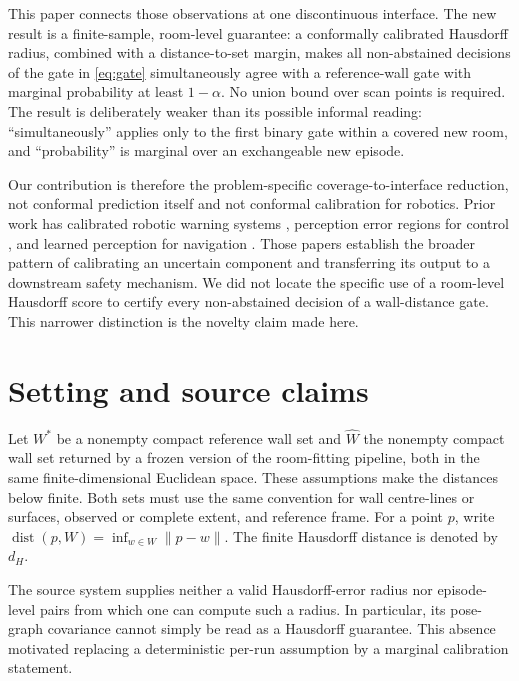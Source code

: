 \documentclass{article}
\DeclareMathOperator{\dist}{dist}
\begin{document}
This paper connects those observations at one discontinuous interface. The new result is a finite-sample, room-level guarantee: a conformally calibrated Hausdorff radius, combined with a distance-to-set margin, makes all non-abstained decisions of the gate in \eqref{eq:gate} simultaneously agree with a reference-wall gate with marginal probability at least $1-\alpha$. No union bound over scan points is required. The result is deliberately weaker than its possible informal reading: ``simultaneously'' applies only to the first binary gate within a covered new room, and ``probability'' is marginal over an exchangeable new episode.

Our contribution is therefore the problem-specific coverage-to-interface reduction, not conformal prediction itself and not conformal calibration for robotics. Prior work has calibrated robotic warning systems \cite{luo2021sample}, perception error regions for control \cite{yang2023safe}, and learned perception for navigation \cite{mei2024perceive}. Those papers establish the broader pattern of calibrating an uncertain component and transferring its output to a downstream safety mechanism. We did not locate the specific use of a room-level Hausdorff score to certify every non-abstained decision of a wall-distance gate. This narrower distinction is the novelty claim made here.

\section{Setting and source claims}

Let $W^*$ be a nonempty compact reference wall set and $\widehat W$ the nonempty compact wall set returned by a frozen version of the room-fitting pipeline, both in the same finite-dimensional Euclidean space. These assumptions make the distances below finite. Both sets must use the same convention for wall centre-lines or surfaces, observed or complete extent, and reference frame. For a point $p$, write $\dist(p,W)=\inf_{w\in W}\lVert p-w\rVert$. The finite Hausdorff distance is denoted by $d_H$.

The source system supplies neither a valid Hausdorff-error radius nor episode-level pairs from which one can compute such a radius. In particular, its pose-graph covariance cannot simply be read as a Hausdorff guarantee. This absence motivated replacing a deterministic per-run assumption by a marginal calibration statement.
\end{document}

